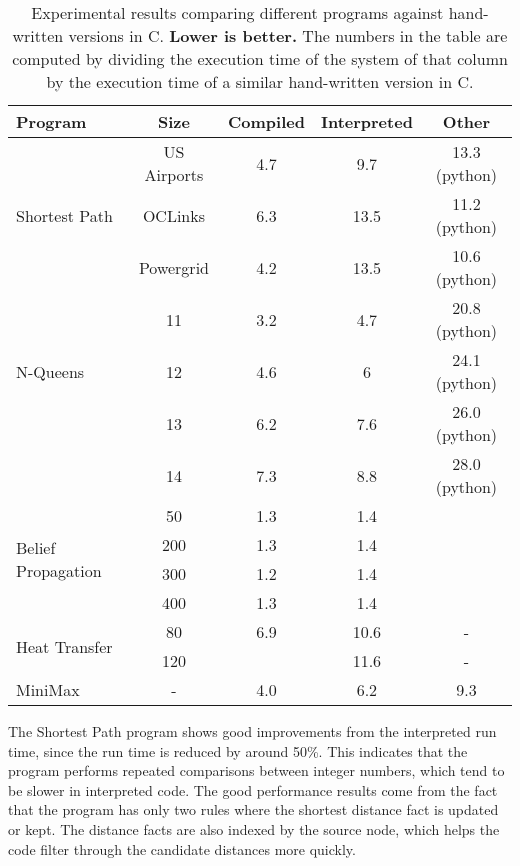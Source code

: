 \begin{table}[ht]
\begin{center}
    \begin{tabular}{ | l | c | c | c | c |}
    \hline
    \textbf{Program} & \textbf{Size} & \textbf{Compiled} & \textbf{Interpreted}
    & \textbf{Other} \\ \hline \hline
    \multirow{3}{*}{Shortest Path} & US Airports & 4.7 & 9.7 & 13.3 (python) \\
    & OCLinks & 6.3 & 13.5 & 11.2 (python) \\
    & Powergrid & 4.2 & 13.5 & 10.6 (python) \\ \hline \hline
    \multirow{3}{*}{N-Queens} & 11 & 3.2 & 4.7 & 20.8 (python) \\
    & 12 & 4.6 & 6 & 24.1 (python) \\
    & 13 & 6.2 & 7.6 & 26.0 (python) \\
    & 14 & 7.3 & 8.8 & 28.0 (python) \\ \hline \hline
    \multirow{4}{*}{Belief Propagation} & 50 & 1.3 & 1.4 & \\
    & 200 & 1.3 & 1.4 & \\ 
    & 300 & 1.2 & 1.4 & \\
    & 400 & 1.3 & 1.4 & \\ \hline \hline
    \multirow{2}{*}{Heat Transfer} & 80 & 6.9 & 10.6 & - \\
    & 120 & & 11.6 & - \\ \hline \hline
    MiniMax & - & 4.0 & 6.2 & 9.3 \\ \hline \hline
    \end{tabular}
\end{center}
\caption{Experimental results comparing different programs against hand-written
   versions in C. \textbf{Lower is better.} The numbers in the table are computed by dividing the
   execution time of the system of that column by the execution time of a
   similar hand-written version in C.}
\label{fig:table_results}
\end{table}

The Shortest Path program shows good improvements from the interpreted run
time, since the run time is reduced by around 50\%. This indicates that the
program performs repeated comparisons between integer numbers, which tend to be
slower in interpreted code. The good performance results come from the fact that
the program has only two rules where the shortest distance fact is updated or
kept. The distance facts are also indexed by the source node, which helps the
code filter through the candidate distances more quickly.

